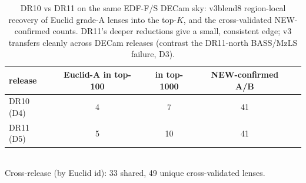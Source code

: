 \begin{table}[t]\centering
\caption{DR10 vs DR11 on the same EDF-F/S DECam sky: v3blend8 region-local recovery of Euclid grade-A lenses into the top-$K$, and the cross-validated NEW-confirmed counts. DR11's deeper reductions give a small, consistent edge; v3 transfers cleanly across DECam releases (contrast the DR11-north BASS/MzLS failure, D3).}
\label{tab:dr1011}\small
\begin{tabular}{lcccc}
\toprule
release & Euclid-A in top-100 & in top-1000 & NEW-confirmed A/B & \\
\midrule
DR10 (D4) & 4 & 7 & 41 & \\
DR11 (D5) & 5 & 10 & 41 & \\
\bottomrule
\end{tabular}
\\[2pt]{\small Cross-release (by Euclid id): 33 shared, 49 unique cross-validated lenses.}
\end{table}
